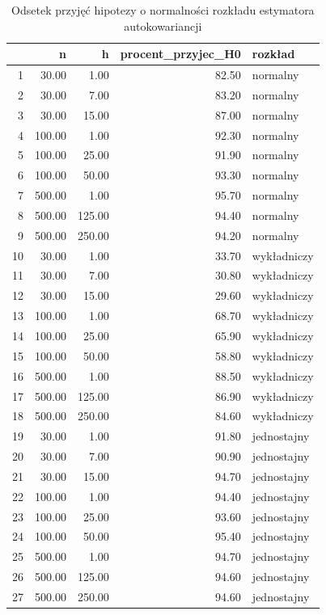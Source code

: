 \documentclass[10pt, a4paper]{article}\usepackage[]{graphicx}\usepackage[]{xcolor}
\begin{document}
\begin{table}[ht]
\centering
\caption{Odsetek przyjęć hipotezy o normalności rozkładu estymatora autokowariancji} 
\label{tab:autokow_normalnosc}
\begin{tabular}{rrrrl}
  \hline
 & n & h & procent\_przyjec\_H0 & rozkład \\ 
  \hline
1 & 30.00 & 1.00 & 82.50 & normalny \\ 
  2 & 30.00 & 7.00 & 83.20 & normalny \\ 
  3 & 30.00 & 15.00 & 87.00 & normalny \\ 
  4 & 100.00 & 1.00 & 92.30 & normalny \\ 
  5 & 100.00 & 25.00 & 91.90 & normalny \\ 
  6 & 100.00 & 50.00 & 93.30 & normalny \\ 
  7 & 500.00 & 1.00 & 95.70 & normalny \\ 
  8 & 500.00 & 125.00 & 94.40 & normalny \\ 
  9 & 500.00 & 250.00 & 94.20 & normalny \\ 
  10 & 30.00 & 1.00 & 33.70 & wykładniczy \\ 
  11 & 30.00 & 7.00 & 30.80 & wykładniczy \\ 
  12 & 30.00 & 15.00 & 29.60 & wykładniczy \\ 
  13 & 100.00 & 1.00 & 68.70 & wykładniczy \\ 
  14 & 100.00 & 25.00 & 65.90 & wykładniczy \\ 
  15 & 100.00 & 50.00 & 58.80 & wykładniczy \\ 
  16 & 500.00 & 1.00 & 88.50 & wykładniczy \\ 
  17 & 500.00 & 125.00 & 86.90 & wykładniczy \\ 
  18 & 500.00 & 250.00 & 84.60 & wykładniczy \\ 
  19 & 30.00 & 1.00 & 91.80 & jednostajny \\ 
  20 & 30.00 & 7.00 & 90.90 & jednostajny \\ 
  21 & 30.00 & 15.00 & 94.70 & jednostajny \\ 
  22 & 100.00 & 1.00 & 94.40 & jednostajny \\ 
  23 & 100.00 & 25.00 & 93.60 & jednostajny \\ 
  24 & 100.00 & 50.00 & 95.40 & jednostajny \\ 
  25 & 500.00 & 1.00 & 94.70 & jednostajny \\ 
  26 & 500.00 & 125.00 & 94.60 & jednostajny \\ 
  27 & 500.00 & 250.00 & 94.60 & jednostajny \\ 
   \hline
\end{tabular}
\end{table}
\end{document}
